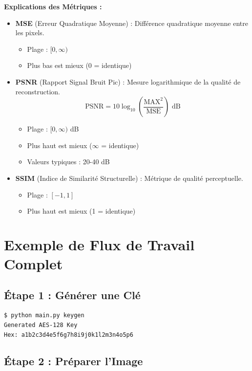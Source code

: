 \documentclass[12pt,a4paper]{report}
\begin{document}
\textbf{Explications des Métriques :}
\begin{itemize}
    \item \textbf{MSE} (Erreur Quadratique Moyenne) : Différence quadratique moyenne entre les pixels.
    \begin{itemize}
        \item Plage : $[0, \infty)$
        \item Plus bas est mieux (0 = identique)
    \end{itemize}
    
    \item \textbf{PSNR} (Rapport Signal Bruit Pic) : Mesure logarithmique de la qualité de reconstruction.
    \begin{equation}
        \text{PSNR} = 10 \log_{10}\left(\frac{\text{MAX}^2}{\text{MSE}}\right) \text{ dB}
    \end{equation}
    \begin{itemize}
        \item Plage : $[0, \infty)$ dB
        \item Plus haut est mieux ($\infty$ = identique)
        \item Valeurs typiques : 20-40 dB
    \end{itemize}
    
    \item \textbf{SSIM} (Indice de Similarité Structurelle) : Métrique de qualité perceptuelle.
    \begin{itemize}
        \item Plage : $[-1, 1]$
        \item Plus haut est mieux (1 = identique)
    \end{itemize}
\end{itemize}

\section{Exemple de Flux de Travail Complet}

\subsection{Étape 1 : Générer une Clé}

\begin{lstlisting}[language=bash]
$ python main.py keygen
Generated AES-128 Key
Hex: a1b2c3d4e5f6g7h8i9j0k1l2m3n4o5p6
\end{lstlisting}

\subsection{Étape 2 : Préparer l'Image}
\end{document}
